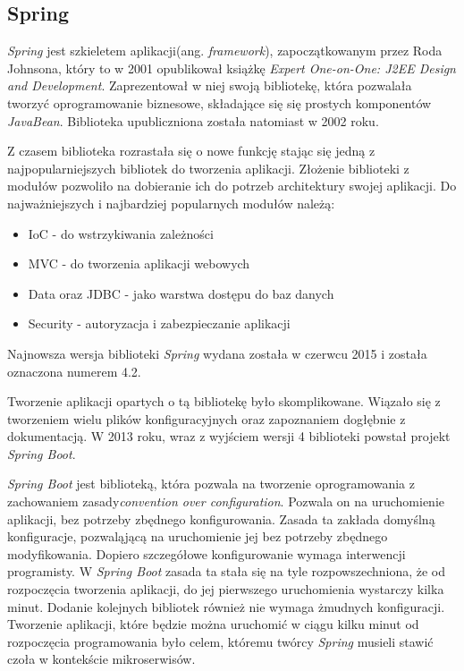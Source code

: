 \subsection{Spring}
\textsl{Spring} jest szkieletem aplikacji(ang. \textsl{framework}), zapoczątkowanym przez Roda Johnsona, który to w 2001 opublikował książkę \textsl{Expert One-on-One: J2EE Design and Development}\cite{jeedesign}. Zaprezentował w niej swoją bibliotekę, która pozwalała tworzyć oprogramowanie biznesowe, składające się się prostych komponentów \textsl{JavaBean}. Biblioteka upubliczniona została natomiast w 2002 roku\cite{springinaction}.

Z czasem biblioteka rozrastała się o nowe funkcję stając się jedną z najpopularniejszych bibliotek do tworzenia aplikacji. Złożenie biblioteki z modułów pozwoliło na dobieranie ich do potrzeb architektury swojej aplikacji. Do najważniejszych i najbardziej popularnych modułów należą:
\begin{itemize}
\item IoC - do wstrzykiwania zależności
\item MVC - do tworzenia aplikacji webowych
\item Data oraz JDBC - jako warstwa dostępu do baz danych
\item Security - autoryzacja i zabezpieczanie aplikacji
\end{itemize}
Najnowsza wersja biblioteki \textsl{Spring} wydana została w czerwcu 2015 i została oznaczona numerem 4.2.

Tworzenie aplikacji opartych o tą bibliotekę było skomplikowane. Wiązało się z tworzeniem wielu plików konfiguracyjnych oraz zapoznaniem dogłębnie z dokumentacją. W 2013 roku, wraz z wyjściem wersji 4 biblioteki powstał projekt \textsl{Spring Boot}. 

\textsl{Spring Boot} jest biblioteką, która pozwala na tworzenie oprogramowania z zachowaniem zasady\textsl{convention over configuration}. Pozwala on na uruchomienie aplikacji, bez potrzeby zbędnego konfigurowania. Zasada ta zakłada domyślną konfiguracje, pozwaląjącą na uruchomienie jej bez potrzeby zbędnego modyfikowania. Dopiero szczegółowe konfigurowanie wymaga interwencji programisty. W \textsl{Spring Boot} zasada ta stała się na tyle rozpowszechniona, że od rozpoczęcia tworzenia aplikacji, do jej pierwszego uruchomienia wystarczy kilka minut. Dodanie kolejnych bibliotek również nie wymaga żmudnych konfiguracji. Tworzenie aplikacji, które będzie można uruchomić w ciągu kilku minut od rozpoczęcia programowania było celem, któremu twórcy \textsl{Spring} musieli stawić czoła w kontekście mikroserwisów. 


